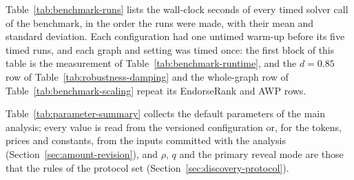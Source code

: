 
Table~\ref{tab:benchmark-runs} lists the wall-clock seconds of every timed solver call of the benchmark, in the order the runs were made, with their mean and standard deviation. Each configuration had one untimed warm-up before its five timed runs, and each graph and setting was timed once: the first block of this table is the measurement of Table~\ref{tab:benchmark-runtime}, and the $d=0.85$ row of Table~\ref{tab:robustness-damping} and the whole-graph row of Table~\ref{tab:benchmark-scaling} repeat its EndorseRank and AWP rows.




Table~\ref{tab:parameter-summary} collects the default parameters of the main analysis; every value is read from the versioned configuration or, for the tokens, prices and constants, from the inputs committed with the analysis (Section~\ref{sec:amount-revision}), and $\rho$, $q$ and the primary reveal mode are those that the rules of the protocol set (Section~\ref{sec:discovery-protocol}).

